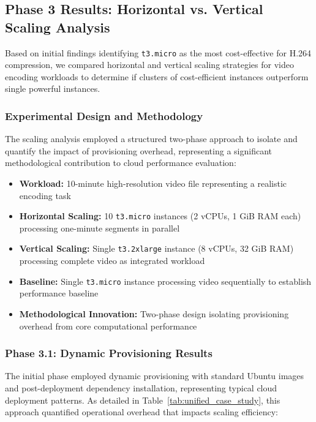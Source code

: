 \documentclass[conference]{IEEEtran}
\begin{document}
	\subsection{Phase 3 Results: Horizontal vs. Vertical Scaling Analysis}
	\label{results-phase3}
	
	Based on initial findings identifying \texttt{t3.micro} as the most cost-effective for H.264 compression, we compared horizontal and vertical scaling strategies for video encoding workloads to determine if clusters of cost-efficient instances outperform single powerful instances.
	
	\subsubsection{Experimental Design and Methodology}
	
	The scaling analysis employed a structured two-phase approach to isolate and quantify the impact of provisioning overhead, representing a significant methodological contribution to cloud performance evaluation:
	
	\begin{itemize}
		\item \textbf{Workload:} 10-minute high-resolution video file representing a realistic encoding task
		\item \textbf{Horizontal Scaling:} 10 \texttt{t3.micro} instances (2 vCPUs, 1 GiB RAM each) processing one-minute segments in parallel
		\item \textbf{Vertical Scaling:} Single \texttt{t3.2xlarge} instance (8 vCPUs, 32 GiB RAM) processing complete video as integrated workload
		\item \textbf{Baseline:} Single \texttt{t3.micro} instance processing video sequentially to establish performance baseline
		\item \textbf{Methodological Innovation:} Two-phase design isolating provisioning overhead from core computational performance
	\end{itemize}
	
	\subsubsection{Phase 3.1: Dynamic Provisioning Results}
	
	The initial phase employed dynamic provisioning with standard Ubuntu images and post-deployment dependency installation, representing typical cloud deployment patterns. As detailed in Table~\ref{tab:unified_case_study}, this approach quantified operational overhead that impacts scaling efficiency:
	
\end{document}

